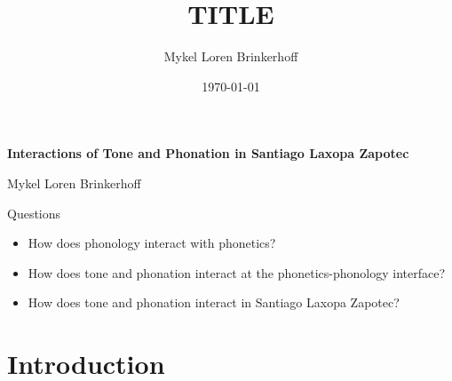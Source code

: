 \documentclass[12pt, letterpaper]{article}
\title{TITLE}
\author{Mykel Loren Brinkerhoff}
\date{\today}
\begin{document}
	
	
\begin{center}
	{\Large \textbf{Interactions of Tone and Phonation in Santiago Laxopa Zapotec}}
	\vspace{6pt}

	Mykel Loren Brinkerhoff
\end{center}
\thispagestyle{fancy}



\begin{tcolorbox}
\begin{center}
Questions
\end{center}

\begin{itemize}
	\item How does phonology interact with phonetics?
	\item How does tone and phonation interact at the phonetics-phonology interface?
	\item How does tone and phonation interact in Santiago Laxopa Zapotec?
\end{itemize}
\end{tcolorbox}

\section{Introduction} \label{sec:Introduction}
\end{document}
